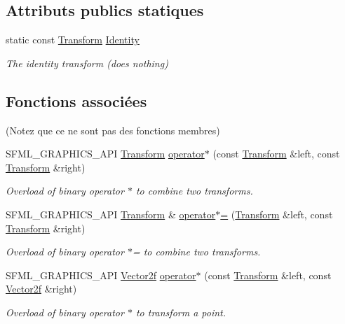 \subsection*{Attributs publics statiques}
\begin{DoxyCompactItemize}
\item 
\mbox{\label{classsf_1_1Transform_aa4eb1eecbcb9979d76e2543b337fdb13}} 
static const \hyperlink{classsf_1_1Transform}{Transform} \hyperlink{classsf_1_1Transform_aa4eb1eecbcb9979d76e2543b337fdb13}{Identity}
\begin{DoxyCompactList}\small\item\em The identity transform (does nothing) \end{DoxyCompactList}\end{DoxyCompactItemize}
\subsection*{Fonctions associées}
(Notez que ce ne sont pas des fonctions membres) \begin{DoxyCompactItemize}
\item 
S\+F\+M\+L\+\_\+\+G\+R\+A\+P\+H\+I\+C\+S\+\_\+\+A\+PI \hyperlink{classsf_1_1Transform}{Transform} \hyperlink{classsf_1_1Transform_a423ade8d6aa1378c695f8eb4bfce8981}{operator$\ast$} (const \hyperlink{classsf_1_1Transform}{Transform} \&left, const \hyperlink{classsf_1_1Transform}{Transform} \&right)
\begin{DoxyCompactList}\small\item\em Overload of binary operator $\ast$ to combine two transforms. \end{DoxyCompactList}\item 
S\+F\+M\+L\+\_\+\+G\+R\+A\+P\+H\+I\+C\+S\+\_\+\+A\+PI \hyperlink{classsf_1_1Transform}{Transform} \& \hyperlink{classsf_1_1Transform_a45a9de70a463117f851f1264a6f558ba}{operator$\ast$=} (\hyperlink{classsf_1_1Transform}{Transform} \&left, const \hyperlink{classsf_1_1Transform}{Transform} \&right)
\begin{DoxyCompactList}\small\item\em Overload of binary operator $\ast$= to combine two transforms. \end{DoxyCompactList}\item 
S\+F\+M\+L\+\_\+\+G\+R\+A\+P\+H\+I\+C\+S\+\_\+\+A\+PI \hyperlink{classsf_1_1Vector2}{Vector2f} \hyperlink{classsf_1_1Transform_ac729169ec3036f3f3f3024c98efd041d}{operator$\ast$} (const \hyperlink{classsf_1_1Transform}{Transform} \&left, const \hyperlink{classsf_1_1Vector2}{Vector2f} \&right)
\begin{DoxyCompactList}\small\item\em Overload of binary operator $\ast$ to transform a point. \end{DoxyCompactList}\end{DoxyCompactItemize}


